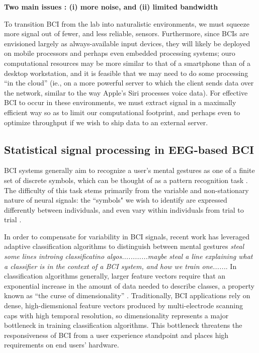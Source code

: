 {\bf Two main issues : (i) more noise, and (ii) limited bandwidth}

To transition BCI from the lab into naturalistic environments, we must squeeze more signal out of fewer, and less reliable, sensors. Furthermore, since BCIs are envisioned largely as always-available input devices, they will likely be deployed on mobile processors and perhaps even embedded processing systems; ouro computational resources may be more similar to that of a smartphone than of a desktop workstation, and it is feasible that we may need to do some processing ``in the cloud'' (ie., on a more powerful server to which the client sends data over the network, similar to the way Apple's Siri processes voice data). For effective BCI to occur in these environments, we must extract signal in a maximally efficient way so as to limit our computational footprint, and perhaps even to optimize throughput if we wish to ship data to an external server.

\subsection{Statistical signal processing in EEG-based BCI}

\noindent BCI systems generally aim to recognize a user's mental gestures as one of a finite set of discrete symbols, which can be thought of as a pattern recognition task \cite{lotte_review_2007}. The difficulty of this task stems primarily from the variable and non-stationary nature of neural signals: the ``symbols" we wish to identify are expressed differently between individuals, and even vary within individuals from trial to trial \cite{vidaurre_fully_2006,vidaurre_machine-learning-based_2011}. 

In order to compensate for variability in BCI signals, recent work has leveraged adaptive classification algorithms to distinguish between mental gestures \cite{lotte_review_2007,vidaurre_machine-learning-based_2011} \textit{steal some lines introing classificatino algos............maybe steal a line explaining what a classifier is in the context of a BCI system, and how we train one......}.  In classification algorithms generally, larger feature vectors require that an exponential increase in the amount of data needed to describe classes, a property known as ``the curse of dimensionality'' \cite{jain_statistical_2000,raudys_small_1991}. Traditionally, BCI applications rely on dense, high-diemsnional feature vectors produced by multi-electrode scanning caps with high temporal resolution, so dimensionality represents a major bottleneck in training classification algorithms. This bottleneck threatens the responsiveness of BCI from a user experience standpoint and places high requirements on end users' hardware.

